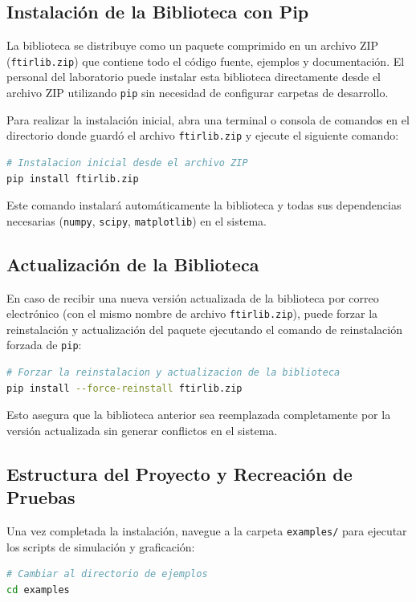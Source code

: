 \documentclass[a4paper,11pt]{article}
\begin{document}
\subsection{Instalación de la Biblioteca con Pip}
La biblioteca se distribuye como un paquete comprimido en un archivo ZIP (\texttt{ftirlib.zip}) que contiene todo el código fuente, ejemplos y documentación. El personal del laboratorio puede instalar esta biblioteca directamente desde el archivo ZIP utilizando \texttt{pip} sin necesidad de configurar carpetas de desarrollo.

Para realizar la instalación inicial, abra una terminal o consola de comandos en el directorio donde guardó el archivo \texttt{ftirlib.zip} y ejecute el siguiente comando:

\begin{lstlisting}[language=bash]
# Instalacion inicial desde el archivo ZIP
pip install ftirlib.zip
\end{lstlisting}

Este comando instalará automáticamente la biblioteca y todas sus dependencias necesarias (\texttt{numpy}, \texttt{scipy}, \texttt{matplotlib}) en el sistema.

\subsection{Actualización de la Biblioteca}
En caso de recibir una nueva versión actualizada de la biblioteca por correo electrónico (con el mismo nombre de archivo \texttt{ftirlib.zip}), puede forzar la reinstalación y actualización del paquete ejecutando el comando de reinstalación forzada de \texttt{pip}:

\begin{lstlisting}[language=bash]
# Forzar la reinstalacion y actualizacion de la biblioteca
pip install --force-reinstall ftirlib.zip
\end{lstlisting}

Esto asegura que la biblioteca anterior sea reemplazada completamente por la versión actualizada sin generar conflictos en el sistema.

\subsection{Estructura del Proyecto y Recreación de Pruebas}
Una vez completada la instalación, navegue a la carpeta \texttt{examples/} para ejecutar los scripts de simulación y graficación:

\begin{lstlisting}[language=bash]
# Cambiar al directorio de ejemplos
cd examples
\end{lstlisting}
\end{document}
